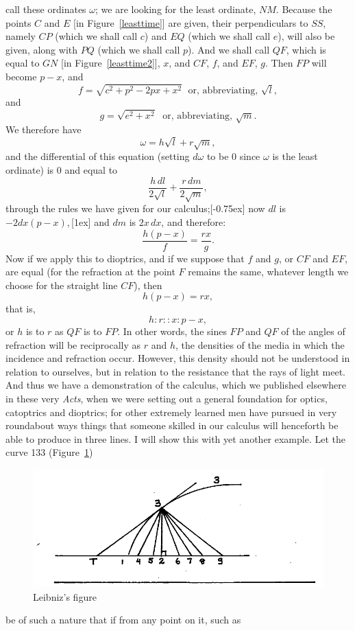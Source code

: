 \documentclass[polutonikogreek,english,twoside,openright]{article}
\begin{document}
call these ordinates $\omega$; we are looking for the least ordinate,
$NM$.  Because the points $C$ and $E$ [in Figure~\ref{leasttime}] are
given, their perpendiculars to $SS$, namely $CP$ (which we shall call
$c$) and $EQ$ (which we shall call $e$), will also be given, along
with $PQ$ (which we shall call $p$).  And we shall call $QF$, which is
equal to $GN$ [in Figure~\ref{leasttime2}], $x$, and $CF$, $f$, and
$EF$, $g$.  Then $FP$ will become $p-x$, and
$$f  = \sqrt{c^2+p^2-2px + x^2}\;\mbox{ or, abbreviating, }\sqrt{l},$$
and
$$g =  \sqrt{e^2+x^2}\;\mbox{ or, abbreviating, }\sqrt{m}.$$ We
therefore have
$$\omega =  h\sqrt{l} + r\sqrt{m},
$$ and the differential of this
equation (setting $d\omega$ to be 0 since $\omega$ is the least
ordinate) is 0 and equal to
$$\frac{h\,dl}{2\sqrt{l}} + \frac{r\,dm}{2\sqrt{m}},$$ through the rules we have
given for our calculus;[-0.75ex] now
$dl$ is $-2dx(p-x),$[1ex] and $dm$
is $2x\,dx$, and therefore:
$$\frac{h(p-x)}{f} = \frac{rx}{g}. $$ Now if we apply this
to dioptrics, and if we suppose that $f$ and $g$, or $CF$ and $EF$,
are equal (for the refraction at the point $F$ remains the same,
whatever length we choose for the straight line $CF$), then
$$h(p-x) = rx,$$ that is,
$$h\!:\!r::x\!:\!p-x,$$ or $h$ is to $r$ as $QF$ is to $FP$.  In other words,
the sines $FP$ and $QF$ of the angles of refraction will be
reciprocally as $r$ and $h$, the densities of the media in which the
incidence and refraction occur.
However, this density should not be understood in relation to
ourselves, but in relation to the resistance that the rays of light
meet.  And thus we have a demonstration of the calculus, which we
published elsewhere in these very {\em Acts}, when we were setting out
a general foundation for optics, catoptrics and
dioptrics; for other extremely
learned men have pursued in very roundabout ways things that someone
skilled in our calculus will henceforth be able to produce in three
lines.\label{enmex2} \label{bnmex3} I will show this with yet another
example.  Let the curve 133 (Figure~\ref{locus})
\begin{figure}[htp]
  \begin{center}
    \includegraphics[width=\textwidth]{fig/Figure24}
    \caption{Leibniz's figure}
    \label{locus}
  \end{center}
\end{figure} be of such a nature that if from any point on it, such as
\end{document}

